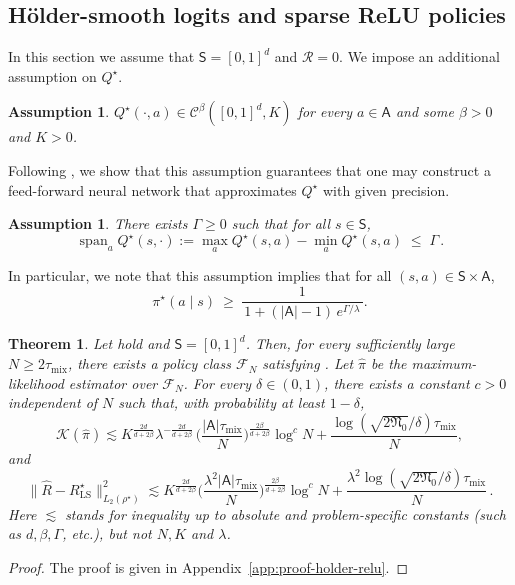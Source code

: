 \documentclass{article}
\newtheorem{theorem}[proposition]{Theorem}
\theoremstyle{definition}
\theoremstyle{remark}
\theoremstyle{plain}
\newtheorem{assumption}[proposition]{Assumption}
\newcommand{\tmix}{\tau_{\mathrm{mix}}}
\numberwithin{equation}{section}
\begin{document}
\subsection{H\"older-smooth logits and sparse ReLU policies}
\label{subsec:relu_policies}
In this section we assume that  $\mathsf{S}=[0,1]^d$ and $\mathcal R = 0$. We impose an additional assumption on $Q^\star$. 
\begin{assumption}
\label{assum:Holder}
$Q^\star(\cdot,a) \in \mathcal C^\beta([0,1]^d, K)$ for every $a \in \mathsf{A}$ and some $\beta > 0$ and $K > 0$.
\end{assumption}
Following \cite{MR4134774}, we show that this assumption guarantees that one may construct a feed-forward neural network that approximates $Q^\star$ with given precision. 
\begin{assumption}
\label{assum: range}
There exists $\Gamma\ge 0$ such that for all $s\in\mathsf S$,
\begin{equation}
\label{eq:spanqstar}
\operatorname{span}_a Q^\star(s,\cdot)
:= \max_{a} Q^\star(s,a) - \min_{a} Q^\star(s,a) \;\le\; \Gamma \, .
\end{equation}
\end{assumption}
In particular, we note that this assumption implies that for all $(s,a) \in \mathsf{S} \times \mathsf{A}$,
\[
\pi^\star(a\mid s)\ \ge\ \frac{1}{\,1+(|\mathsf A|-1)\,e^{\Gamma/\lambda}\,}.
\]

\begin{theorem}
\label{thm:holder-relu-rate}
 Let  hold and $\mathsf{S}=[0,1]^d$. Then, for every sufficiently large \(N\geq2\tmix\), there exists a policy
class \(\mathcal F_N\) satisfying . Let
\(\widehat\pi\) be the maximum-likelihood estimator over
\(\mathcal F_N\). For every $\delta\in(0,1)$, there exists a constant $c>0$ independent of $N$ such that, with probability at least $1-\delta$,  
\[
\mathcal{K}(\widehat\pi) \lesssim  K^{\frac{2d}{d+2\beta}}\lambda^{-\frac{2d}{d+2\beta}}\,
\Big(\frac{ |\mathsf{A}| \tmix}{N}\Big)^{\frac{2\beta}{d+2\beta}} \log^c N  + \frac{\log({\sqrt{2\mathfrak N_0}}/{\delta}) \tmix}{N},
\]
and 
\[
\|\widehat R - R_{\mathrm{LS}}^\star\|_{L_2(\rho^\star)}^2 \lesssim 
K^{\frac{2d}{d+2\beta}} \Big(\frac{ \lambda^2|\mathsf{A}|\tmix}{N}\Big)^{\frac{2\beta}{d+2\beta}} \log^c N  + \frac{\lambda^2 \log({\sqrt{2\mathfrak N_0}}/{\delta}) \tmix}{N} \, .
\]
Here $\lesssim$ stands for inequality up to absolute and problem-specific constants (such as $d, \beta, \Gamma$, etc.), but not $N, K$ and $\lambda$.  
\end{theorem}
\begin{proof}
    The proof is given in Appendix~\ref{app:proof-holder-relu}.  
\end{proof}
\end{document}
